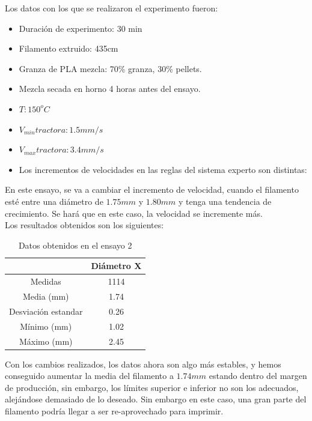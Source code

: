 Los datos con los que se realizaron el experimento fueron:

\begin{itemize}
	\item{Duración de experimento: 30 min}
	\item{Filamento extruido: 435cm}
	\item{Granza de PLA mezcla: 70\% granza, 30\% pellets.}
	\item{Mezcla secada en horno 4 horas antes del ensayo.}
	\item{$T: 150^oC$}
	\item{$V_{min} tractora: 1.5 mm/s$}
	\item{$V_{max} tractora: 3.4 mm/s$}
	\item{Los incrementos de velocidades en las reglas del sistema experto son distintas:}
\end{itemize}

En este ensayo, se va a cambiar el incremento de velocidad, cuando el filamento esté entre una diámetro de $1.75 mm$ y $1.80 mm$ y tenga una tendencia de crecimiento. Se hará que en este caso, la velocidad se incremente más.\\

Los resultados obtenidos son los siguientes:

\begin{table}[H]
	\centering
	\begin{tabular}{cc}
		                    & Diámetro X \\ \hline
		Medidas             & 1114      \\
		Media (mm)          & 1.74       \\
		Desviación estandar & 0.26       \\
		Mínimo (mm)         & 1.02       \\
		Máximo (mm)         & 2.45      
	\end{tabular}
	\caption{Datos obtenidos en el ensayo 2}
	\label{tab:resl_ens2}
\end{table}

Con los cambios realizados, los datos ahora son algo más estables, y hemos conseguido aumentar la media del filamento a $1.74 mm$ estando dentro del margen de producción, sin embargo, los límites superior e inferior no son los adecuados, alejándose demasiado de lo deseado. Sin embargo en este caso, una gran parte del filamento podría llegar a ser re-aprovechado para imprimir.

